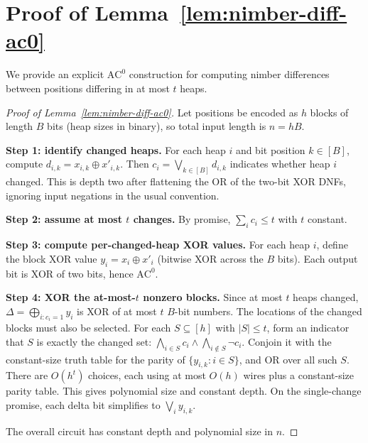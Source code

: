 \documentclass[11pt]{article}
\newcommand{\AC}{\mathrm{AC}}
\theoremstyle{plain}
\theoremstyle{definition}
\theoremstyle{remark}
\numberwithin{equation}{section}
\begin{document}
\section{Proof of Lemma~\ref{lem:nimber-diff-ac0}}
\label{app:nimberdiff}

We provide an explicit $\AC^0$ construction for computing nimber differences between positions differing in at most $t$ heaps.

\begin{proof}[Proof of Lemma~\ref{lem:nimber-diff-ac0}]
Let positions be encoded as $h$ blocks of length $B$ bits (heap sizes in binary), so total input length is $n=hB$.

\textbf{Step 1: identify changed heaps.}
For each heap $i$ and bit position $k\in[B]$, compute $d_{i,k} = x_{i,k}\oplus x'_{i,k}$.
Then $c_i = \bigvee_{k\in[B]} d_{i,k}$ indicates whether heap $i$ changed.
This is depth two after flattening the OR of the two-bit XOR DNFs, ignoring input negations in the usual convention.

\textbf{Step 2: assume at most $t$ changes.}
By promise, $\sum_i c_i \le t$ with $t$ constant.

\textbf{Step 3: compute per-changed-heap XOR values.}
For each heap $i$, define the block XOR value $y_i = x_i \oplus x'_i$ (bitwise XOR across the $B$ bits). Each output bit is XOR of two bits, hence $\AC^0$.

\textbf{Step 4: XOR the at-most-$t$ nonzero blocks.}
Since at most $t$ heaps changed, $\Delta = \bigoplus_{i:c_i=1} y_i$ is XOR of at most $t$ $B$-bit numbers.
The locations of the changed blocks must also be selected. For each $S\subseteq[h]$ with $|S|\le t$, form an indicator that $S$ is exactly the changed set: $\bigwedge_{i\in S}c_i\wedge\bigwedge_{i\notin S}\neg c_i$. Conjoin it with the constant-size truth table for the parity of $\{y_{i,k}:i\in S\}$, and OR over all such $S$. There are $O(h^t)$ choices, each using at most $O(h)$ wires plus a constant-size parity table. This gives polynomial size and constant depth. On the single-change promise, each delta bit simplifies to $\bigvee_i y_{i,k}$.

The overall circuit has constant depth and polynomial size in $n$.
\end{proof}

\end{document}
